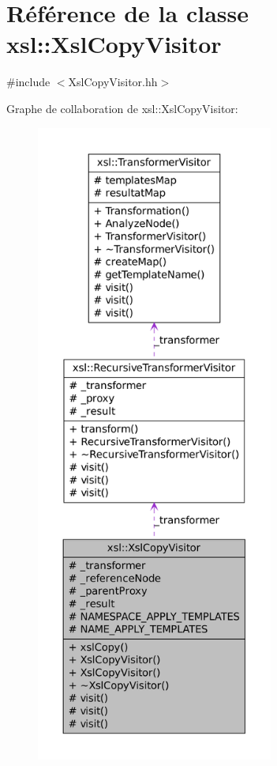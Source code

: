 \hypertarget{classxsl_1_1_xsl_copy_visitor}{
\section{Référence de la classe xsl::XslCopyVisitor}
\label{classxsl_1_1_xsl_copy_visitor}
}


{\ttfamily \#include $<$XslCopyVisitor.hh$>$}



Graphe de collaboration de xsl::XslCopyVisitor:
\nopagebreak
\begin{figure}[H]
\begin{center}
\leavevmode
\includegraphics[height=600pt]{classxsl_1_1_xsl_copy_visitor__coll__graph}
\end{center}
\end{figure}
